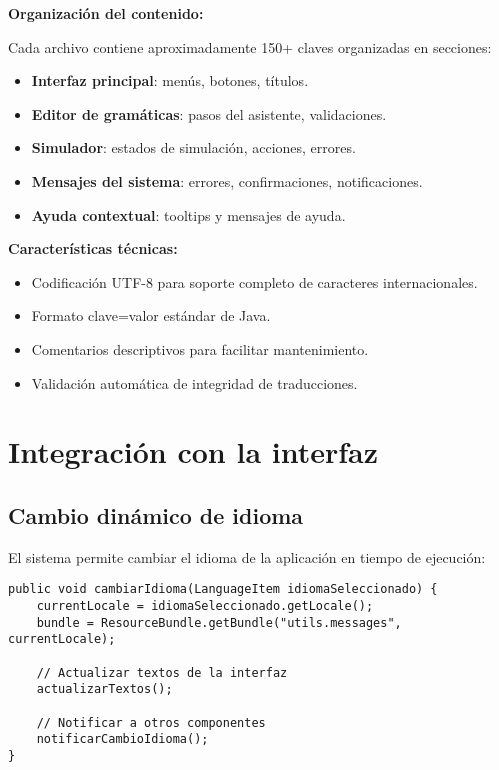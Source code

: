 \textbf{Organización del contenido:}

Cada archivo contiene aproximadamente 150+ claves organizadas en secciones:
\begin{itemize}
    \item \textbf{Interfaz principal}: menús, botones, títulos.
    \item \textbf{Editor de gramáticas}: pasos del asistente, validaciones.
    \item \textbf{Simulador}: estados de simulación, acciones, errores.
    \item \textbf{Mensajes del sistema}: errores, confirmaciones, notificaciones.
    \item \textbf{Ayuda contextual}: tooltips y mensajes de ayuda.
\end{itemize}

\textbf{Características técnicas:}
\begin{itemize}
    \item Codificación UTF-8 para soporte completo de caracteres internacionales.
    \item Formato clave=valor estándar de Java.
    \item Comentarios descriptivos para facilitar mantenimiento.
    \item Validación automática de integridad de traducciones.
\end{itemize}

\section{Integración con la interfaz}

\subsection{Cambio dinámico de idioma}

El sistema permite cambiar el idioma de la aplicación en tiempo de ejecución:

\begin{lstlisting}[caption=Método para cambiar idioma]
public void cambiarIdioma(LanguageItem idiomaSeleccionado) {
    currentLocale = idiomaSeleccionado.getLocale();
    bundle = ResourceBundle.getBundle("utils.messages", currentLocale);
    
    // Actualizar textos de la interfaz
    actualizarTextos();
    
    // Notificar a otros componentes
    notificarCambioIdioma();
}
\end{lstlisting}

